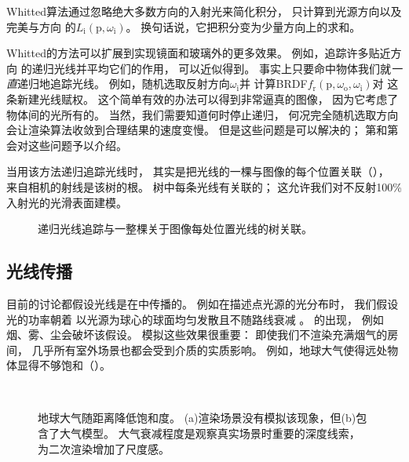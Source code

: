 Whitted算法通过忽略绝大多数方向的入射光来简化积分，
只计算到光源方向以及
完美与方向
的$L_{\mathrm{i}}(\mathrm{p},\omega_\mathrm{i})$。
换句话说，它把积分变为少量方向上的求和。

Whitted的方法可以扩展到实现镜面和玻璃外的更多效果。
例如，追踪许多贴近方向
的递归光线并平均它们的作用，
可以近似得到。
事实上只要命中物体我们就\emph{一直}递归地追踪光线。
例如，随机选取反射方向$\omega_\mathrm{i}$并
计算BRDF$f_{\mathrm{r}}(\mathrm{p},\omega_\mathrm{o},\omega_\mathrm{i})$对
这条新建光线赋权。
这个简单有效的办法可以得到非常逼真的图像，
因为它考虑了物体间的光所有的。
当然，我们需要知道何时停止递归，
何况完全随机选取方向会让渲染算法收敛到合理结果的速度变慢。
但是这些问题是可以解决的；
第和第会对这些问题予以介绍。

当用该方法递归追踪光线时，
其实是把光线的一棵与图像的每个位置关联（），
来自相机的射线是该树的根。
树中每条光线有关联的；
这允许我们对不反射100\%入射光的光滑表面建模。
\begin{figure}
      \centering
      \caption{递归光线追踪与一整棵关于图像每处位置光线的树关联。}\label{fig:1.8}
\end{figure}

\subsection{光线传播}\label{sub:光线传播}

目前的讨论都假设光线是在中传播的。
例如在描述点光源的光分布时，
我们假设光的功率朝着
以光源为球心的球面均匀发散且不随路线衰减
。
的出现，
例如烟、雾、尘会破坏该假设。
模拟这些效果很重要：
即使我们不渲染充满烟气的房间，
几乎所有室外场景也都会受到介质的实质影响。
例如，地球大气使得远处物体显得不够饱和（）。
\begin{figure}
      \centering
      \\
      \caption{地球大气随距离降低饱和度。
            (a)渲染场景没有模拟该现象，但(b)包含了大气模型。
            大气衰减程度是观察真实场景时重要的深度线索，
            为二次渲染增加了尺度感。}
      \label{fig:1.9}
\end{figure}

